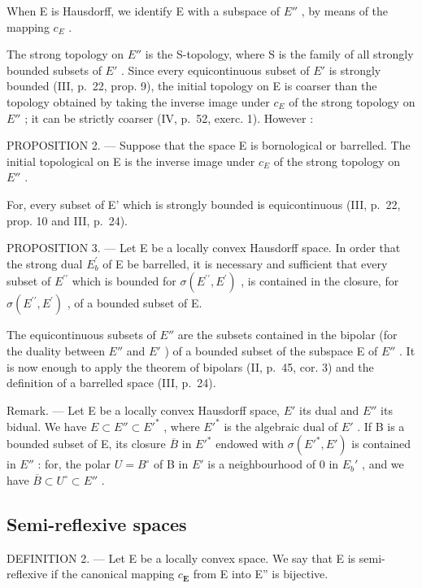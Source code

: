 When E is Hausdorff, we identify E with a subspace of \(E''\) , by means of the mapping \(c_{E}\) .

The strong topology on \(E''\) is the S-topology, where S is the family of all strongly bounded subsets of \(E'\) . Since every equicontinuous subset of \(E'\) is strongly bounded (III, p.~22, prop. 9), the initial topology on E is coarser than the topology obtained by taking the inverse image under \(c_{E}\) of the strong topology on \(E''\) ; it can be strictly coarser (IV, p.~52, exerc. 1). However :

PROPOSITION 2. --- Suppose that the space E is bornological or barrelled. The initial topological on E is the inverse image under \(c_{E}\) of the strong topology on \(E''\) .

For, every subset of E' which is strongly bounded is equicontinuous (III, p.~22, prop. 10 and III, p.~24).

PROPOSITION 3. --- Let E be a locally convex Hausdorff space. In order that the strong dual \(E_{b}^{\prime}\) of E be barrelled, it is necessary and sufficient that every subset of \(E^{\prime\prime}\) which is bounded for \(\sigma(E^{\prime\prime}, E^{\prime})\) , is contained in the closure, for \(\sigma(E^{\prime\prime}, E^{\prime})\) , of a bounded subset of E.

The equicontinuous subsets of \(E''\) are the subsets contained in the bipolar (for the duality between \(E''\) and \(E'\) ) of a bounded subset of the subspace E of \(E''\) . It is now enough to apply the theorem of bipolars (II, p.~45, cor. 3) and the definition of a barrelled space (III, p.~24).

Remark. --- Let E be a locally convex Hausdorff space, \(E'\) its dual and \(E''\) its bidual. We have \(E \subset E'' \subset E'^{*}\) , where \(E'^{*}\) is the algebraic dual of \(E'\) . If B is a bounded subset of E, its closure \(\overline{B}\) in \(E'^{*}\) endowed with \(\sigma(E'^{*}, E')\) is contained in \(E''\) : for, the polar \(U = B^{\circ}\) of B in \(E'\) is a neighbourhood of 0 in \(E_b'\) , and we have \(\overline{B} \subset U^{\circ} \subset E''\) .

\subsection{Semi-reflexive spaces}

DEFINITION 2. --- Let E be a locally convex space. We say that E is semi-reflexive if the canonical mapping \(c_{\mathbf{E}}\) from E into E'' is bijective.

